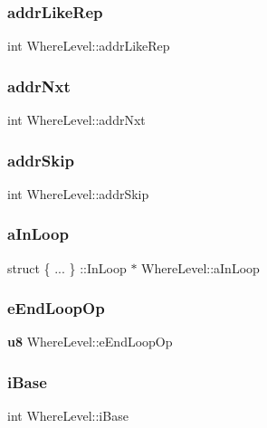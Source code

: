 \subsubsection{addrLikeRep}
{\footnotesize\ttfamily int Where\+Level\+::addr\+Like\+Rep}

\mbox{\label{struct_where_level_ab4b748f1fa2ec727f00ca42d9df60144}} 
\subsubsection{addrNxt}
{\footnotesize\ttfamily int Where\+Level\+::addr\+Nxt}

\mbox{\label{struct_where_level_ae7fa600bc2de02c08095ae310e69e594}} 
\subsubsection{addrSkip}
{\footnotesize\ttfamily int Where\+Level\+::addr\+Skip}

\mbox{\label{struct_where_level_a3dc199c61e679259f1d232d64d69e325}} 
\subsubsection{aInLoop}
{\footnotesize\ttfamily struct \{ ... \} \+::In\+Loop $\ast$ Where\+Level\+::a\+In\+Loop}

\mbox{\label{struct_where_level_aa0132042a041d447a07fcd8b79c8240c}} 
\subsubsection{eEndLoopOp}
{\footnotesize\ttfamily \textbf{ u8} Where\+Level\+::e\+End\+Loop\+Op}

\mbox{\label{struct_where_level_a348192c953a72562384ed6833c975495}} 
\subsubsection{iBase}
{\footnotesize\ttfamily int Where\+Level\+::i\+Base}

\mbox{\label{struct_where_level_a963cea5470448482e3e8f2f083f4c452}} 
